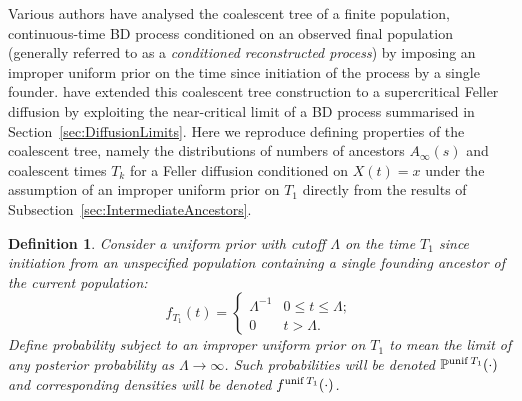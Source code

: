 \documentclass[preprint,12pt]{elsarticle}
\newtheorem{definition}{Definition}
\begin{document}
Various authors \citep{Aldous05,Gernhard08,Wiuf18,Ignatieva20} have analysed the coalescent tree of a finite population, continuous-time BD process conditioned on an observed final population 
(generally referred to as a {\em conditioned reconstructed process}) by imposing an improper uniform prior on the time since initiation of the process by a single founder.  
\citet{BurdenGriffiths24} have extended this coalescent tree construction to a supercritical Feller diffusion by exploiting the near-critical limit of a BD process summarised in 
Section~\ref{sec:DiffusionLimits}.  Here we reproduce defining properties of the coalescent tree, namely the distributions of numbers of ancestors $A_\infty(s)$  
and coalescent times $T_k$ for a Feller diffusion conditioned on $X(t) = x$ under the assumption of an improper uniform prior on $T_1$ directly from 
the results of Subsection~\ref{sec:IntermediateAncestors}.  

\begin{definition}
Consider a uniform prior with cutoff $\Lambda$ on the time $T_1$ since initiation from an unspecified population containing a single founding ancestor 
of the current population: 
\begin{equation*}	%
f_{T_1}(t) = \begin{cases}
	\Lambda ^{-1} & 0 \le t \le \Lambda; \\
	0                     & t > \Lambda. 
	\end{cases}
\end{equation*} 
Define {\em probability subject to an improper uniform prior on $T_1$} to mean the limit of any posterior probability as $\Lambda \to \infty$.  
Such probabilities will be denoted $\mathbb{P}^{{\rm unif}\,T_1} (\cdot)$ and corresponding densities will be denoted $f^{{\rm unif}\,T_1} (\cdot)$.
\end{definition}
\end{document}
